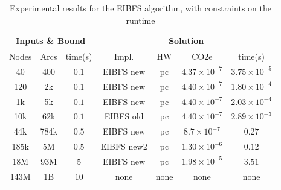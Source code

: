 \documentclass[a4paper,singleside,12pt]{report} %
\begin{document}
\begin{table}[h!]
    \centering
    \begin{tabular}{|ccc|cccc|}
        \hline
        \multicolumn{3}{|c|}{Inputs \& Bound} & \multicolumn{4}{c|}{Solution} \\
        \hline
        Nodes & Arcs & time(s) & Impl. & HW & CO2e & time(s) \\
        \hline
        40 & 400 & $0.1$ & EIBFS new & pc & $4.37 \times 10^{-7}$ & $3.75 \times 10^{-5}$ \\
        120 & 2k & $0.1$ & EIBFS new & pc & $4.40 \times 10^{-7}$ & $1.80 \times 10^{-4}$ \\
        1k & 5k & $0.1$ & EIBFS new & pc & $4.40 \times 10^{-7}$ & $2.03 \times 10^{-4}$ \\
        10k & 62k & $0.1$ & EIBFS old & pc & $4.40 \times 10^{-7}$ & $2.89 \times 10^{-3}$ \\
        44k & 784k & $0.5$ & EIBFS new & pc & $8.7 \times 10^{-7}$ & $0.27$ \\
        185k & 5M & $0.5$ & EIBFS new2 & pc & $1.30 \times 10^{-6}$ & $0.12$ \\
        18M & 93M & $5$ & EIBFS new & pc & $1.98 \times 10^{-5}$& $3.51$ \\
        143M & 1B & $10$ & none & none & none & none \\
        \hline
    \end{tabular}
    \caption{Experimental results for the EIBFS algorithm, with constraints on the runtime}
    \label{tab:eibfs_results}
\end{table}
\end{document}
